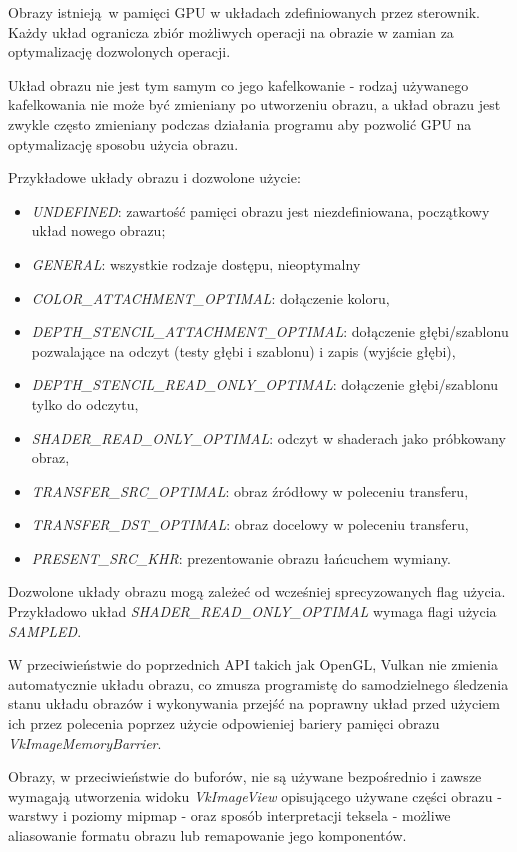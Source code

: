 Obrazy istnieją w pamięci GPU w układach zdefiniowanych przez sterownik.
Każdy układ ogranicza zbiór możliwych operacji na obrazie w zamian za optymalizację dozwolonych operacji.

Układ obrazu nie jest tym samym co jego kafelkowanie - rodzaj używanego kafelkowania nie może być zmieniany po utworzeniu obrazu, a układ obrazu jest zwykle często zmieniany podczas działania programu aby pozwolić GPU na optymalizację sposobu użycia obrazu.

Przykładowe układy obrazu i dozwolone użycie:
\begin{itemize}
	\item \textit{UNDEFINED}: zawartość pamięci obrazu jest niezdefiniowana, początkowy układ nowego obrazu;
	\item \textit{GENERAL}: wszystkie rodzaje dostępu, nieoptymalny
	\item \textit{COLOR\_ATTACHMENT\_OPTIMAL}: dołączenie koloru,
	\item \textit{DEPTH\_STENCIL\_ATTACHMENT\_OPTIMAL}: dołączenie głębi/szablonu pozwalające na odczyt (testy głębi i szablonu) i zapis (wyjście głębi),
	\item \textit{DEPTH\_STENCIL\_READ\_ONLY\_OPTIMAL}: dołączenie głębi/szablonu tylko do odczytu,
	\item \textit{SHADER\_READ\_ONLY\_OPTIMAL}: odczyt w shaderach jako próbkowany obraz,
	\item \textit{TRANSFER\_SRC\_OPTIMAL}: obraz źródłowy w poleceniu transferu,
	\item \textit{TRANSFER\_DST\_OPTIMAL}: obraz docelowy w poleceniu transferu,
	\item \textit{PRESENT\_SRC\_KHR}: prezentowanie obrazu łańcuchem wymiany.
\end{itemize}
Dozwolone układy obrazu mogą zależeć od wcześniej sprecyzowanych flag użycia. Przykładowo układ \textit{SHADER\_READ\_ONLY\_OPTIMAL} wymaga flagi użycia \textit{SAMPLED}.

W przeciwieństwie do poprzednich API takich jak OpenGL, Vulkan nie zmienia automatycznie układu obrazu, co zmusza
programistę do samodzielnego śledzenia stanu układu obrazów i wykonywania przejść na poprawny układ przed użyciem ich przez polecenia poprzez użycie odpowieniej bariery pamięci obrazu \textit{VkImageMemoryBarrier}.

Obrazy, w przeciwieństwie do buforów, nie są używane bezpośrednio i zawsze wymagają utworzenia widoku \textit{VkImageView} opisującego używane części obrazu - warstwy i poziomy mipmap - oraz sposób interpretacji teksela - możliwe aliasowanie formatu obrazu lub remapowanie jego komponentów.

